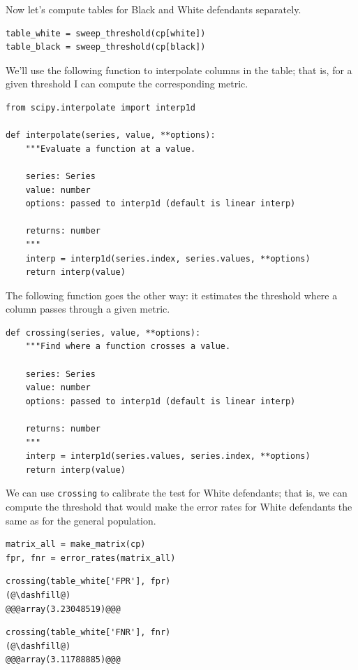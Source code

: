Now let's compute tables for Black and White defendants separately.

\begin{lstlisting}[]
table_white = sweep_threshold(cp[white])
table_black = sweep_threshold(cp[black])
\end{lstlisting}

We'll use the following function to interpolate columns in the table;
that is, for a given threshold I can compute the corresponding metric.

\begin{lstlisting}[]
from scipy.interpolate import interp1d

def interpolate(series, value, **options):
    """Evaluate a function at a value.
    
    series: Series
    value: number
    options: passed to interp1d (default is linear interp)
    
    returns: number
    """
    interp = interp1d(series.index, series.values, **options)
    return interp(value)
\end{lstlisting}

The following function goes the other way: it estimates the threshold
where a column passes through a given metric.

\begin{lstlisting}[]
def crossing(series, value, **options):
    """Find where a function crosses a value.
    
    series: Series
    value: number
    options: passed to interp1d (default is linear interp)
    
    returns: number
    """
    interp = interp1d(series.values, series.index, **options)
    return interp(value)
\end{lstlisting}

We can use \passthrough{\lstinline!crossing!} to calibrate the test for
White defendants; that is, we can compute the threshold that would make
the error rates for White defendants the same as for the general
population.

\begin{lstlisting}[]
matrix_all = make_matrix(cp)
fpr, fnr = error_rates(matrix_all)
\end{lstlisting}

\begin{lstlisting}[]
crossing(table_white['FPR'], fpr)
(@\dashfill@)
@@@array(3.23048519)@@@
\end{lstlisting}

\begin{lstlisting}[]
crossing(table_white['FNR'], fnr)
(@\dashfill@)
@@@array(3.11788885)@@@
\end{lstlisting}

